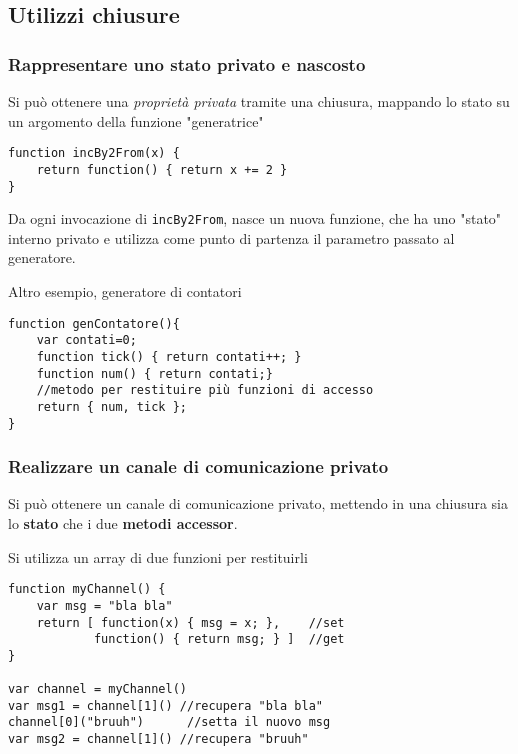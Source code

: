\subsection{Utilizzi chiusure}

\subsubsection{Rappresentare uno stato privato e nascosto}
Si può ottenere una \textit{proprietà privata} tramite una chiusura, mappando lo stato su un argomento della funzione "generatrice"
\begin{verbatim}
function incBy2From(x) {
    return function() { return x += 2 }
}
\end{verbatim}

Da ogni invocazione di \texttt{incBy2From}, nasce un nuova funzione, che ha uno "stato" interno privato e utilizza come punto di partenza il parametro passato al generatore.

Altro esempio, generatore di contatori
\begin{verbatim}
function genContatore(){
    var contati=0;
    function tick() { return contati++; }
    function num() { return contati;}
    //metodo per restituire più funzioni di accesso
    return { num, tick };
}
\end{verbatim}

\subsubsection{Realizzare un canale di comunicazione privato}
Si può ottenere un canale di comunicazione privato, mettendo in una chiusura sia lo \textbf{stato} che i due \textbf{metodi accessor}.

Si utilizza un array di due funzioni per restituirli
\begin{verbatim}
function myChannel() {
    var msg = "bla bla"
    return [ function(x) { msg = x; },    //set
            function() { return msg; } ]  //get
}

var channel = myChannel()
var msg1 = channel[1]() //recupera "bla bla"
channel[0]("bruuh")      //setta il nuovo msg
var msg2 = channel[1]() //recupera "bruuh"
\end{verbatim}

